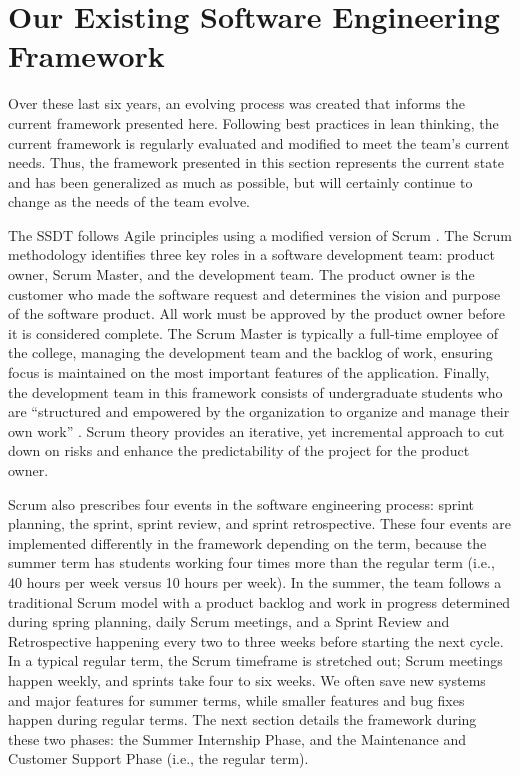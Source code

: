 \section{Our Existing Software Engineering Framework}

Over these last six years, an evolving process was created that informs the current framework presented here. Following best practices in lean thinking, the current framework is regularly evaluated and modified to meet the team's current needs. Thus, the framework presented in this section represents the current state and has been generalized as much as possible, but will certainly continue to change as the needs of the team evolve.

The SSDT follows Agile principles \cite{agilemanifesto} using a modified version of Scrum \cite{thescrumguide}. The Scrum methodology identifies three key roles in a software development team: product owner, Scrum Master, and the development team. The product owner is the customer who made the software request and determines the vision and purpose of the software product. All work must be approved by the product owner before it is considered complete. The Scrum Master is typically a full-time employee of the college, managing the development team and the backlog of work, ensuring focus is maintained on the most important features of the application. Finally, the development team in this framework consists of undergraduate students who are ``structured and empowered by the organization to organize and manage their own work'' \cite{thescrumguide}. Scrum theory provides an iterative, yet incremental approach to cut down on risks and enhance the predictability of the project for the product owner.

Scrum also prescribes four events in the software engineering process: sprint planning, the sprint, sprint review, and sprint retrospective. These four events are implemented differently in the framework depending on the term, because the summer term has students working four times more than the regular term (i.e., 40 hours per week versus 10 hours per week). In the summer, the team follows a traditional Scrum model with a product backlog and work in progress determined during spring planning, daily Scrum meetings, and a Sprint Review and Retrospective happening every two to three weeks before starting the next cycle. In a typical regular term, the Scrum timeframe is stretched out; Scrum meetings happen weekly, and sprints take four to six weeks. We often save new systems and major features for summer terms, while smaller features and bug fixes happen during regular terms. The next section details the framework during these two phases: the Summer Internship Phase, and the Maintenance and Customer Support Phase (i.e., the regular term).

